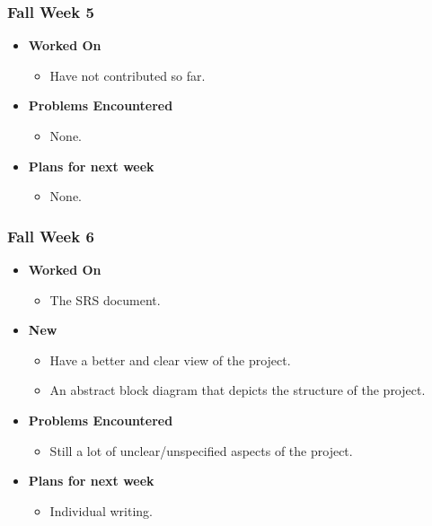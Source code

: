 \documentclass[compsoc,draftclsnofoot,onecolumn,10pt]{IEEEtran}
\begin{document}
\subsubsection{Fall Week 5}
\begin{itemize}
    \item {\textbf{Worked On}}
    \begin{itemize}
      \item Have not contributed so far.
    \end{itemize}

    \item {\textbf{Problems Encountered}}
    \begin{itemize}
      \item None.
    \end{itemize}

    \item{\textbf{Plans for next week}}
    \begin{itemize}
      \item None.
    \end{itemize}

\end{itemize}

\subsubsection{Fall Week 6}
\begin{itemize}
    \item {\textbf{Worked On}}
    \begin{itemize}
      \item The SRS document.
    \end{itemize}

    \item {\textbf{New}}
    \begin{itemize}
      \item Have a better and clear view of the project.
      \item An abstract block diagram that depicts the structure of the project.
    \end{itemize}

    \item {\textbf{Problems Encountered}}
    \begin{itemize}
      \item Still a lot of unclear/unspecified aspects of the project.
    \end{itemize}

    \item{\textbf{Plans for next week}}
    \begin{itemize}
      \item Individual writing.
    \end{itemize}

\end{itemize}
\end{document}
